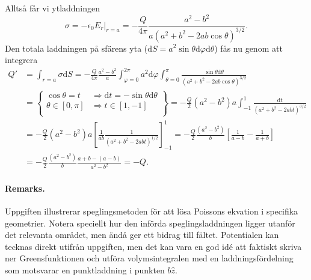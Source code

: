 \documentclass[%
oneside,                 %
final,                   %
10pt]{article}
\newenvironment{doconceexercise}{}{}
\begin{document}
\begin{doconceexercise}
Alltså får vi ytladdningen
$$
\sigma = -\epsilon_0 \left. E_r \right|_{r=a} = -\frac{Q}{4 \pi} \frac{a^2 - b^2}{a \left( a^2 + b^2 - 2 a b \cos\theta \right)^{3/2}}.
$$
Den totala laddningen på sfärens yta ($\mbox{d}S = a^2 \sin\theta \mbox{d}\varphi \mbox{d}\theta$) fås nu genom att integrera
\begin{align}
Q' &= \int_{r=a} \sigma \mbox{d}S = -\frac{Q}{4\pi} \frac{a^2-b^2}{a} \int_{\varphi=0}^{2\pi} a^2 \mbox{d}\varphi \int_{\theta=0}^\pi \frac{\sin\theta \mbox{d}\theta}{\left( a^2 + b^2 - 2 a b \cos\theta \right)^{3/2}} \nonumber \\
&= \left\{ \begin{array}{ll}
\cos\theta = t & \Rightarrow \mbox{d}t = -\sin\theta \mbox{d}\theta \\
\theta \in [0,\pi] & \Rightarrow t \in [1,-1] \\
\end{array} \right\} = - \frac{Q}{2} (a^2 - b^2) a \int_{-1}^1 \frac{\mbox{d}t} {\left( a^2 + b^2 - 2 a b t \right)^{3/2}} \nonumber \\
& = - \frac{Q}{2} (a^2 - b^2) a \left[ \frac{1}{ab} \frac{1}{\left( a^2 + b^2 - 2 a b t \right)^{1/2}} \right]_{-1}^1 = - \frac{Q}{2} \frac{(a^2 - b^2)}{b} \left[ \frac{1}{a-b} - \frac{1}{a+b} \right] \nonumber \\
& = - \frac{Q}{2} \frac{(a^2 - b^2)}{b} \frac{a + b - (a - b)}{a^2 - b^2} = -Q.
\end{align}



\paragraph{Remarks.}
Uppgiften illustrerar speglingsmetoden för att lösa Poissons ekvation i specifika geometrier. Notera speciellt hur den införda speglingsladdningen ligger utanför det relevanta området, men ändå ger ett bidrag till fältet. Potentialen kan tecknas direkt utifrån uppgiften, men det kan vara en god idé att faktiskt skriva ner Greensfunktionen och utföra volymsintegralen med en laddningsfördelning som motsvarar en punktladdning i punkten $b \hat{z}$.


\end{doconceexercise}


\end{document}
